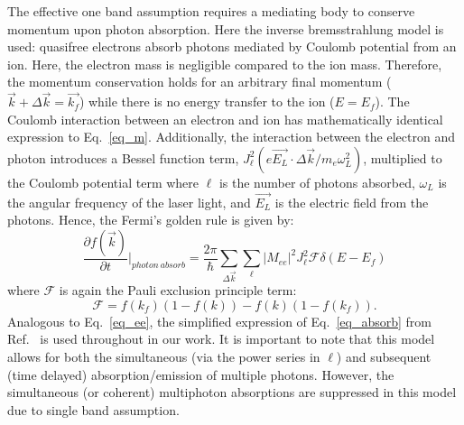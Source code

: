 The effective one band assumption requires a mediating body to conserve momentum upon photon absorption.  Here the inverse bremsstrahlung model is used: quasifree electrons absorb photons mediated by Coulomb potential from an ion.\cite{Delone1993,rethfeld} Here, the electron mass is negligible compared to the ion mass. Therefore, the momentum conservation holds for an arbitrary final momentum ($\vec{k} + \Delta \vec{k} =\vec{k_f}$) while there is no energy transfer to the ion ($E = E_f$). The Coulomb interaction between an electron and ion has mathematically identical expression to Eq.~\ref{eq_m}. Additionally, the interaction between the electron and photon introduces a Bessel function term, $J_\ell^2(e\vec{E_L}\cdot \Delta \vec{k}/m_e \omega_L^2)$, multiplied to the Coulomb potential term where $\ell$ is the number of photons absorbed, $\omega_L$ is the angular frequency of the laser light, and $\vec{E_L}$ is the electric field from the photons.\cite{Seely1973} Hence, the Fermi's golden rule is given by:
\begin{equation}\label{eq_absorb}
	\frac{\partial f(\vec{k})}{\partial t}\biggr|_{photon\: absorb} = \frac{2\pi}{\hbar}\sum_{\Delta\vec{k}}\sum_\ell |M_{ee}|^2 J_\ell^2 \mathcal{F} \delta(E-E_f)
\end{equation}
where $\mathcal{F}$ is again the Pauli exclusion principle term:\cite{rethfeld,boltzmann}
\begin{equation}
	\mathcal{F} = f(k_f)(1-f(k))-f(k)(1-f(k_f)).
\end{equation}
Analogous to Eq.~\ref{eq_ee}, the simplified expression of Eq.~\ref{eq_absorb} from Ref.~\cite{boltzmann} is used throughout in our work. It is important to note that this model allows for both the simultaneous (via the power series in $\ell$) and subsequent (time delayed) absorption/emission of multiple photons. However, the simultaneous (or coherent) multiphoton absorptions are suppressed in this model due to single band assumption.

